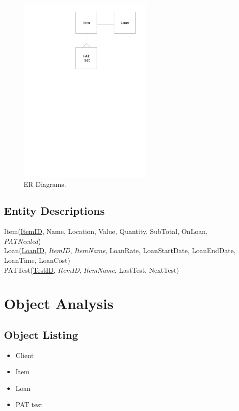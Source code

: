 \documentclass[a4paper,12pt]{report}
\begin{document}
\begin{figure}[H]
    \caption{ER Diagrams.} \label{fig:ER Diagrams}
    \centerline{\includegraphics[width=250px]{./ER_Diagrams/ER_Diagrams.pdf}}
\end{figure}

\newpage

\subsection{Entity Descriptions}

Item(\underline{ItemID}, Name, Location, Value, Quantity, SubTotal, OnLoan,\\
\noindent \emph{PATNeeded})\\

\noindent Loan(\underline{LoanID}, \emph{ItemID}, \emph{ItemName}, LoanRate, LoanStartDate, LoanEndDate, LoanTime, LoanCost)\\

\noindent PATTest(\underline{TestID}, \emph{ItemID}, \emph{ItemName}, LastTest, NextTest)

\section{Object Analysis}

\subsection{Object Listing}

\begin{itemize}
    \item Client
    \item Item
    \item Loan
    \item PAT test
\end{itemize}
\end{document}
